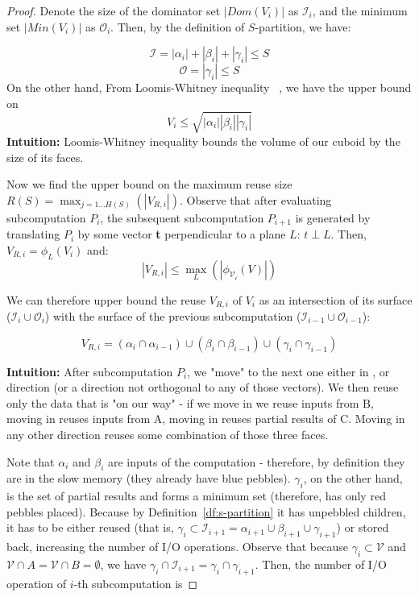 \documentclass[sigplan,review,anonymous]{acmart}\settopmatter{printfolios=true,printccs=false,printacmref=false}
\begin{document}
\begin{proof}
Denote the size of the dominator set $|Dom(V_i)|$ as $\mathcal{I}_i$, and the 
minimum set $|Min(V_i)|$ as $\mathcal{O}_i$.
 Then, by the definition of $S$-partition, we have:
 
 $$\mathcal{I} = |\alpha_i| + |\beta_i| + |\gamma_i| \le S$$
 $$\mathcal{O} = |\gamma_i| \le S$$
On the other hand, From Loomis-Whitney inequality
~\cite{loomisWhitney}, we have the upper bound on 
 $$V_i \le \sqrt{|\alpha_i| |\beta_i| |\gamma_i|}$$ 
\textbf{Intuition:} Loomis-Whitney inequality bounds the volume of our cuboid 
by the size of its faces.
 
Now we find the upper bound on the maximum reuse size $R(S) = \max_{j = 1 \dots 
H(S)}(|V_{R,i}|)$. Observe that 
after 
evaluating subcomputation $P_i$, the subsequent subcomputation $P_{i+1}$ is 
generated by translating $P_i$ by some vector \textbf{t} perpendicular to a 
plane $L$: 
$t \perp L$. Then, $V_{R,i} = \phi_L(V_i)$ and:
 $$|V_{R,i}| \le \max_L(|\phi_\mathcal{V_i}(V)|)$$

We can therefore upper bound the reuse $V_{R,i}$ of $V_i$ as an intersection of 
its surface ($\mathcal{I}_i \cup \mathcal{O}_i$) with the surface of the 
previous subcomputation ($\mathcal{I}_{i-1} \cup \mathcal{O}_{i-1}$):

 $$V_{R,i} = (\alpha_i \cap \alpha_{i-1}) \cup (\beta_i \cap
\beta_{i-1}) \cup (\gamma_i \cap \gamma_{i-1}) $$

\textbf{Intuition:} After subcomputation $P_i$, we "move" to the next one 
either in ,  or  direction (or a direction not 
orthogonal to any of those vectors). We then reuse only the data that is "on 
our way" - if we move in  we reuse inputs from B, moving in  
reuses inputs from A, moving in  reuses partial results of C. Moving in 
any other direction reuses some combination of those three faces.
 
Note that $\alpha_i$ and 
   $\beta_i$
 are inputs of the computation - therefore, by definition they are in the slow 
 memory (they 
 already have blue pebbles). $\gamma_i$, on the other hand, is 
   the
 set of partial results and forms a minimum set (therefore, has only red 
 pebbles placed). Because by Definition~\ref{df:s-partition} it has unpebbled 
 children, it has to be either reused (that is, $\gamma_i \subset 
 \mathcal{I}_{i+1} 
 =  \alpha_{i+1} \cup \beta_{i+1} \cup \gamma_{i+1}$) or 
 stored back, increasing the 
 number of I/O operations. Observe that because $\gamma_i \subset \mathcal{V}$ 
 and 
 $\mathcal{V} \cap A = \mathcal{V} \cap B = \emptyset$, we have $\gamma_i \cap 
 \mathcal{I}_{i+1} 
 =  \gamma_i \cap \gamma_{i+1}$. Then, the number of I/O operation of $i$-th 
 subcomputation is
 

\end{proof}
\end{document}

